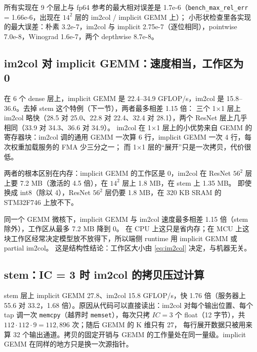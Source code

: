 \documentclass[11pt,a4paper]{ctexart}
\begin{document}
所有实现在 9 个层上与 fp64 参考的最大相对误差是 1.7e-6（\texttt{bench\_max\_rel\_err} = 1.66e-6，出现在 $14^2$ 层的 im2col / implicit GEMM 上）；
小形状检查里各实现的最大误差：朴素 3.2e-7，im2col 与 implicit 2.75e-7（逐位相同），pointwise 7.0e-8，Winograd 1.6e-7，两个 depthwise 8.7e-8。

\subsection{im2col 对 implicit GEMM：速度相当，工作区为 0}\label{sec:res-gemm}

在 6 个 dense 层上，implicit GEMM 是 22.4--34.9 GFLOP/s，im2col 是 15.8--36.6。去掉 stem 这个特例（下一节），两者最多相差 1.15 倍：
三个 1×1 层上 im2col 略快（28.5 对 25.0、22.8 对 22.4、32.4 对 28.1），两个 ResNet 层上几乎相同（33.9 对 34.3、36.6 对 34.9）。
im2col 在 1×1 层上的小优势来自 GEMM 的寄存器块：im2col 调的通用 GEMM 一次算 6 行，implicit GEMM 一次 4 行，每次权重加载服务的 FMA 少三分之一；
而 1×1 层的“展开”只是一次拷贝，代价很低。

两者的根本区别在内存：implicit GEMM 的工作区是 0，im2col 在 ResNet $56^2$ 层上要 7.2 MB（激活的 4.5 倍），在 $14^2$ 层上 1.8 MB，在 stem 上 1.35 MB。
即使换成 int8（除以 4），ResNet $56^2$ 层仍要 1.8 MB，在 320 KB SRAM 的 STM32F746 上放不下。

\begin{findingbox}
同一个 GEMM 微核下，implicit GEMM 与 im2col 速度最多相差 1.15 倍（stem 除外），工作区从最多 7.2 MB 降到 0。
在 CPU 上这只是省内存；在 MCU 上这块工作区经常决定模型放不放得下，所以端侧 runtime 用 implicit GEMM 或 partial im2col。
这是结构性结论：工作区大小由 \cref{eq:im2col} 决定，与机器无关。
\end{findingbox}

\subsection{stem：IC = 3 时 im2col 的拷贝压过计算}\label{sec:res-stem}

stem 层上 implicit GEMM 27.8、im2col 15.8 GFLOP/s，快 1.76 倍（服务器上 55.6 对 33.2，1.68 倍）。原因从代码可以直接读出：im2col 对每个输出位置、每个 tap
调一次 \texttt{memcpy}（越界时 \texttt{memset}），每次只拷 $IC = 3$ 个 float（12 字节），共 $112\cdot112\cdot9 = 112{,}896$ 次；随后 GEMM 的 K 维只有 27，
每行展开数据只被用来算 32 个输出通道。拷贝的固定开销与 GEMM 的工作量处在同一量级。implicit GEMM 在同样的地方只是换一次源指针。
\end{document}
